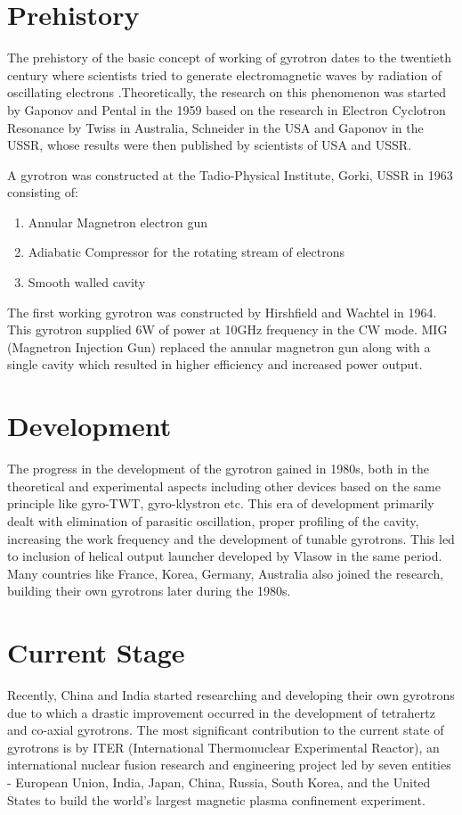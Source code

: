 \section{Prehistory}\label{sec:beginning}
The prehistory of the basic concept of working of gyrotron dates to the twentieth century where scientists tried to generate electromagnetic waves by radiation of oscillating electrons .Theoretically, the research on this phenomenon was started by 
Gaponov and Pental in the 1959 based on the research in Electron Cyclotron Resonance by Twiss in Australia, Schneider in the USA and Gaponov in the USSR, whose results were then published by scientists of USA and USSR.\cite{ref:tg}\cite{ref:gt}
 
A gyrotron was constructed at the Tadio-Physical Institute, Gorki, USSR in 1963 consisting of:

\begin{enumerate}
\item Annular Magnetron electron gun
\item Adiabatic Compressor for the rotating stream of electrons
\item Smooth walled cavity
\end{enumerate}

The first working gyrotron was constructed by Hirshfield and Wachtel in 1964. This gyrotron supplied 6W of power at 10GHz frequency in the CW mode. MIG (Magnetron Injection Gun) replaced the annular magnetron gun along with a single cavity which resulted in higher efficiency and increased power output.

\section{Development}
The progress in the development of the gyrotron gained in 1980s, both in the theoretical and experimental aspects including other devices based on the same principle like gyro-TWT, gyro-klystron  etc. This era of development primarily dealt with elimination of parasitic oscillation, proper profiling of the cavity, increasing the work frequency and the development of tunable gyrotrons. This led to inclusion of helical output launcher developed by Vlasow in the same period. Many countries like France, Korea, Germany, Australia also joined the research, building their own gyrotrons later during the 1980s.

\section{Current Stage}
 Recently, China and India started researching and developing their own gyrotrons due to which a drastic improvement occurred in the development of tetrahertz and co-axial gyrotrons. The most significant contribution to the current state of gyrotrons is by ITER (International Thermonuclear Experimental Reactor), an international nuclear fusion research and engineering project led by seven entities - European Union, India, Japan, China, Russia, South Korea, and the United States to build the world's largest magnetic plasma confinement experiment.

